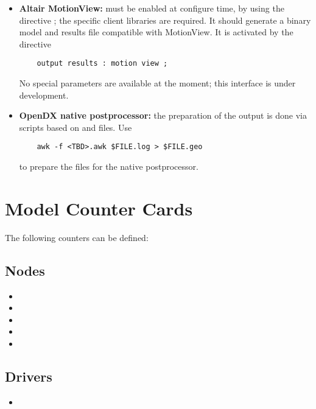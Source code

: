 \begin{itemize}
\item \textbf{Altair MotionView:}
must be enabled at configure time, by using the directive
; the specific client libraries 
are required.
It should generate a binary model and results file compatible
with MotionView.
It is activated by the directive
\begin{verbatim}
    output results : motion view ;
\end{verbatim}
No special parameters are available at the moment; 
this interface is under development.

\item \textbf{OpenDX native postprocessor:}
the preparation of the output is done via  scripts
based on  and  files.
Use
\begin{verbatim}
    awk -f <TBD>.awk $FILE.log > $FILE.geo
\end{verbatim}
to prepare the files for the native postprocessor.


\end{itemize}


\section{Model Counter Cards}
The following counters can be defined:
\subsection{Nodes}
\begin{itemize}
\item {}
\item {}
\item {}
\item {}
\item {}
\end{itemize}

\subsection{Drivers}
\begin{itemize}
\item {}
\end{itemize}

